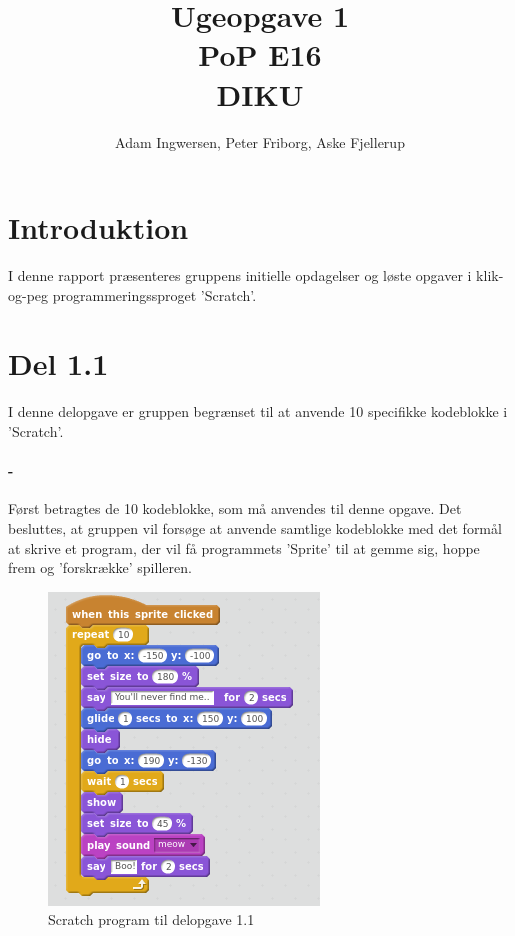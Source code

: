 \documentclass[11pt,a4paper,final]{article}
\begin{document}
\author{Adam Ingwersen, Peter Friborg, Aske Fjellerup}
\title{Ugeopgave 1 \\ PoP E16 \\ DIKU}
\maketitle

\section*{Introduktion}
I denne rapport præsenteres gruppens initielle opdagelser og løste opgaver i klik-og-peg programmeringssproget 'Scratch'. 

\section*{Del 1.1}
I denne delopgave er gruppen begrænset til at anvende 10 specifikke kodeblokke i 'Scratch'. 

\paragraph{-}
Først betragtes de 10 kodeblokke, som må anvendes til denne opgave. Det besluttes, at gruppen vil forsøge at anvende samtlige kodeblokke med det formål at skrive et program, der vil få programmets 'Sprite' til at gemme sig, hoppe frem og 'forskrække' spilleren. 

\begin{figure}[H]
\centering
\includegraphics[scale = 0.4]{1_1.png}
\caption{Scratch program til delopgave 1.1}
\end{figure}

\pagebreak
\end{document}
